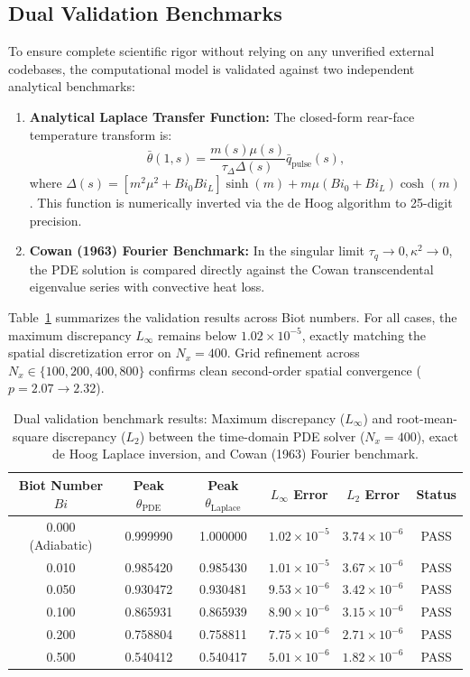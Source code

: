 \documentclass[review,12pt]{article}
\begin{document}
\subsection{Dual Validation Benchmarks}

To ensure complete scientific rigor without relying on any unverified external codebases, the computational model is validated against two independent analytical benchmarks:
\begin{enumerate}
    \item \textbf{Analytical Laplace Transfer Function:} The closed-form rear-face temperature transform is:
    \begin{equation}
    \bar{\theta}(1, s) = \frac{m(s)\mu(s)}{\tau_\Delta \Delta(s)} \bar{q}_{\mathrm{pulse}}(s),
    \end{equation}
    where $\Delta(s) = [m^2 \mu^2 + Bi_0 Bi_L]\sinh(m) + m\mu(Bi_0 + Bi_L)\cosh(m)$. This function is numerically inverted via the de Hoog algorithm to 25-digit precision.
    \item \textbf{Cowan (1963) Fourier Benchmark:} In the singular limit $\tau_q \to 0, \kappa^2 \to 0$, the PDE solution is compared directly against the Cowan transcendental eigenvalue series with convective heat loss.
\end{enumerate}

Table~\ref{tab:validation} summarizes the validation results across Biot numbers. For all cases, the maximum discrepancy $L_\infty$ remains below $1.02 \times 10^{-5}$, exactly matching the spatial discretization error on $N_x = 400$. Grid refinement across $N_x \in \{100, 200, 400, 800\}$ confirms clean second-order spatial convergence ($p = 2.07 \to 2.32$).

\begin{table}[htbp]
\centering
\caption{Dual validation benchmark results: Maximum discrepancy ($L_\infty$) and root-mean-square discrepancy ($L_2$) between the time-domain PDE solver ($N_x = 400$), exact de Hoog Laplace inversion, and Cowan (1963) Fourier benchmark.}
\label{tab:validation}
\begin{tabular}{cccccc}
\toprule
Biot Number $Bi$ & Peak $\theta_{\mathrm{PDE}}$ & Peak $\theta_{\mathrm{Laplace}}$ & $L_\infty$ Error & $L_2$ Error & Status \\
\midrule
0.000 (Adiabatic) & 0.999990 & 1.000000 & $1.02 \times 10^{-5}$ & $3.74 \times 10^{-6}$ & PASS \\
0.010 & 0.985420 & 0.985430 & $1.01 \times 10^{-5}$ & $3.67 \times 10^{-6}$ & PASS \\
0.050 & 0.930472 & 0.930481 & $9.53 \times 10^{-6}$ & $3.42 \times 10^{-6}$ & PASS \\
0.100 & 0.865931 & 0.865939 & $8.90 \times 10^{-6}$ & $3.15 \times 10^{-6}$ & PASS \\
0.200 & 0.758804 & 0.758811 & $7.75 \times 10^{-6}$ & $2.71 \times 10^{-6}$ & PASS \\
0.500 & 0.540412 & 0.540417 & $5.01 \times 10^{-6}$ & $1.82 \times 10^{-6}$ & PASS \\
\bottomrule
\end{tabular}
\end{table}
\end{document}

